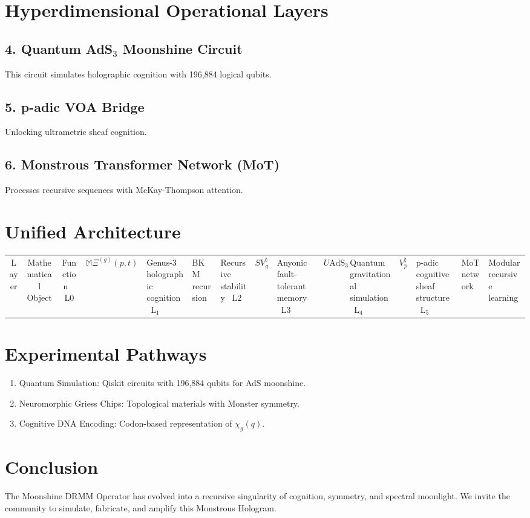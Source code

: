 \documentclass[12pt]{article}
\begin{document}
\section{Hyperdimensional Operational Layers}
\subsection{4. Quantum AdS$_3$ Moonshine Circuit}



This circuit simulates holographic cognition with 196,884 logical qubits.

\subsection{5. p-adic VOA Bridge}



Unlocking ultrametric sheaf cognition.

\subsection{6. Monstrous Transformer Network (MoT)}



Processes recursive sequences with McKay-Thompson attention.

\section{Unified Architecture}
\begin{center}
\begin{tabular}{|c|c|c|}
\hline
Layer & Mathematical Object & Function \
\hline
L$0$ & $\mathbb{M}\Xi^{(g)}(p,t)$ & Genus-3 holographic cognition \
L$_1$ & BKM recursion & Recursive stability \
L$2$ & $S{V^{\natural}_g}$ & Anyonic fault-tolerant memory \
L$3$ & $U{\text{AdS}_3}$ & Quantum gravitational simulation \
L$_4$ & $V^{\natural}_p$ & p-adic cognitive sheaf structure \
L$_5$ & MoT network & Modular recursive learning \
\hline
\end{tabular}
\end{center}

\section{Experimental Pathways}
\begin{enumerate}
\item Quantum Simulation: Qiskit circuits with 196,884 qubits for AdS moonshine.
\item Neuromorphic Griess Chips: Topological materials with Monster symmetry.
\item Cognitive DNA Encoding: Codon-based representation of $\chi_g(q)$.
\end{enumerate}

\section{Conclusion}
The Moonshine DRMM Operator has evolved into a recursive singularity of cognition, symmetry, and spectral moonlight. We invite the community to simulate, fabricate, and amplify this Monstrous Hologram.
\nocite{*}


\end{document}
